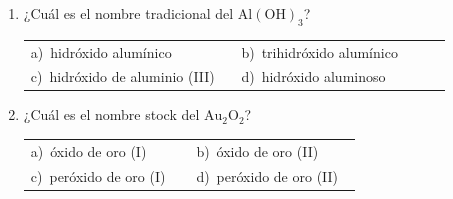 \documentclass[11pt,a4paper]{article}
\begin{document}
\begin{enumerate}[label=\textbf{\arabic*.},leftmargin=*,itemsep=11pt,topsep=0pt]
\item \begin{minipage}[t]{\linewidth}
¿Cuál es el nombre tradicional del $\mathrm{Al(OH)_{3}}$?

\vspace{5pt}
\begin{tabular}{@{}p{0.47\linewidth}p{0.47\linewidth}@{}}
a)~hidróxido alumínico & b)~trihidróxido alumínico \\
c)~hidróxido de aluminio (III) & d)~hidróxido aluminoso \\
\end{tabular}
\end{minipage}

\item \begin{minipage}[t]{\linewidth}
¿Cuál es el nombre stock del $\mathrm{Au_{2}O_{2}}$?

\vspace{5pt}
\begin{tabular}{@{}p{0.47\linewidth}p{0.47\linewidth}@{}}
a)~óxido de oro (I) & b)~óxido de oro (II) \\
c)~peróxido de oro (I) & d)~peróxido de oro (II) \\
\end{tabular}
\end{minipage}

\end{enumerate}
\end{document}

